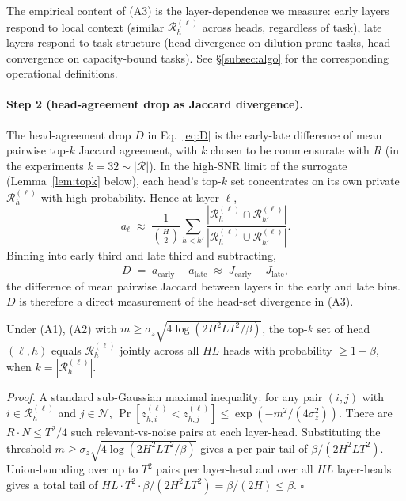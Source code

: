 The empirical content of (A3) is the layer-dependence we measure: early
layers respond to local context (similar $\mathcal{R}^{(\ell)}_h$ across
heads, regardless of task), late layers respond to task structure (head
divergence on dilution-prone tasks, head convergence on capacity-bound
tasks). See \S\ref{subsec:algo} for the corresponding operational
definitions.

\paragraph{Step 2 (head-agreement drop as Jaccard divergence).}
The head-agreement drop $D$ in Eq.~\eqref{eq:D} is the early-late
difference of mean pairwise top-$k$ Jaccard agreement, with $k$ chosen
to be commensurate with $R$ (in the experiments $k = 32 \sim |\mathcal{R}|$).
In the high-SNR limit of the surrogate (Lemma~\ref{lem:topk} below),
each head's top-$k$ set concentrates on its own private
$\mathcal{R}^{(\ell)}_h$ with high probability. Hence at layer $\ell$,
\begin{equation}
a_\ell \;\approx\; \frac{1}{\binom{H}{2}} \sum_{h < h'}
\frac{|\mathcal{R}^{(\ell)}_h \cap \mathcal{R}^{(\ell)}_{h'}|}
{|\mathcal{R}^{(\ell)}_h \cup \mathcal{R}^{(\ell)}_{h'}|}.
\end{equation}
Binning into early third and late third and subtracting,
\begin{equation}
\label{eq:D-jaccard}
D \;=\; a_{\text{early}} - a_{\text{late}}
\;\approx\;
\overline{J}_{\text{early}} - \overline{J}_{\text{late}},
\end{equation}
the difference of mean pairwise Jaccard between layers in the early and
late bins. $D$ is therefore a direct measurement of the head-set
divergence in (A3).

\begin{lemma}
\label{lem:topk}
Under (A1), (A2) with $m \geq \sigma_z \sqrt{4 \log(2 H^2 L T^2 / \beta)}$,
the top-$k$ set of head $(\ell, h)$ equals $\mathcal{R}^{(\ell)}_h$
jointly across all $HL$ heads with probability $\geq 1 - \beta$, when
$k = |\mathcal{R}^{(\ell)}_h|$.
\end{lemma}

\emph{Proof.} A standard sub-Gaussian maximal inequality: for any pair
$(i, j)$ with $i \in \mathcal{R}^{(\ell)}_h$ and $j \in \mathcal{N}$,
$\Pr[z_{h, i}^{(\ell)} < z_{h, j}^{(\ell)}] \leq \exp(-m^2 /
(4 \sigma_z^2))$. There are $R \cdot N \leq T^2 / 4$ such relevant-vs-noise
pairs at each layer-head. Substituting the threshold $m \geq
\sigma_z \sqrt{4 \log(2 H^2 L T^2 / \beta)}$ gives a per-pair tail of
$\beta / (2 H^2 L T^2)$. Union-bounding over up to $T^2$ pairs per
layer-head and over all $HL$ layer-heads gives a total tail of $HL \cdot
T^2 \cdot \beta / (2 H^2 L T^2) = \beta / (2 H) \leq \beta$.
\hfill $\square$

